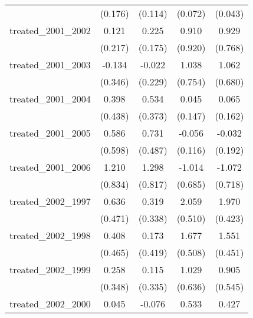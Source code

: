 {\begin{tabular}{l*{4}{c}}
            &     (0.176)         &     (0.114)         &     (0.072)         &     (0.043)         \\
[1em]
treated\_2001\_2002&       0.121         &       0.225         &       0.910         &       0.929         \\
            &     (0.217)         &     (0.175)         &     (0.920)         &     (0.768)         \\
[1em]
treated\_2001\_2003&      -0.134         &      -0.022         &       1.038         &       1.062         \\
            &     (0.346)         &     (0.229)         &     (0.754)         &     (0.680)         \\
[1em]
treated\_2001\_2004&       0.398         &       0.534         &       0.045         &       0.065         \\
            &     (0.438)         &     (0.373)         &     (0.147)         &     (0.162)         \\
[1em]
treated\_2001\_2005&       0.586         &       0.731         &      -0.056         &      -0.032         \\
            &     (0.598)         &     (0.487)         &     (0.116)         &     (0.192)         \\
[1em]
treated\_2001\_2006&       1.210         &       1.298         &      -1.014         &      -1.072         \\
            &     (0.834)         &     (0.817)         &     (0.685)         &     (0.718)         \\
[1em]
treated\_2002\_1997&       0.636         &       0.319         &       2.059\sym{***}&       1.970\sym{***}\\
            &     (0.471)         &     (0.338)         &     (0.510)         &     (0.423)         \\
[1em]
treated\_2002\_1998&       0.408         &       0.173         &       1.677\sym{***}&       1.551\sym{***}\\
            &     (0.465)         &     (0.419)         &     (0.508)         &     (0.451)         \\
[1em]
treated\_2002\_1999&       0.258         &       0.115         &       1.029         &       0.905         \\
            &     (0.348)         &     (0.335)         &     (0.636)         &     (0.545)         \\
[1em]
treated\_2002\_2000&       0.045         &      -0.076         &       0.533         &       0.427         \\

\end{tabular}}
